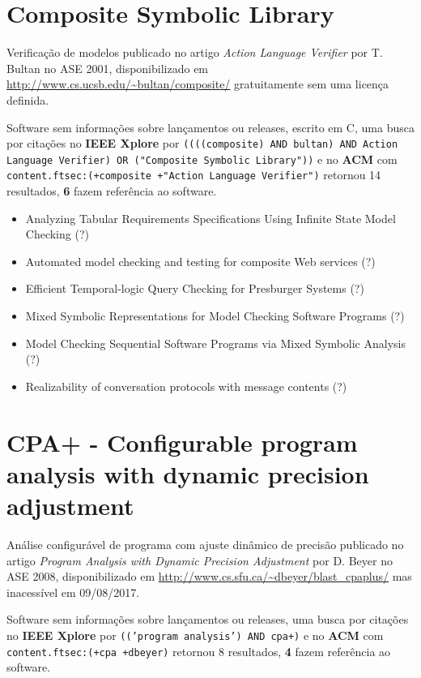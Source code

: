 \section{Composite Symbolic Library}

Verificação de modelos
publicado no artigo {\it Action Language Verifier}
por T. Bultan
no ASE 2001,
disponibilizado em \url{http://www.cs.ucsb.edu/~bultan/composite/}
gratuitamente
sem uma licença definida.

Software sem informações sobre lançamentos ou releases,
escrito em C,
uma busca por citações no {\bf IEEE Xplore} por
\texttt{((((composite) AND bultan) AND Action Language Verifier) OR ("Composite Symbolic Library"))}
e no {\bf ACM} com
\texttt{content.ftsec:(+composite +"Action Language Verifier")}
retornou
14 resultados,
{\bf 6} fazem referência ao software.

\begin{itemize}
\item Analyzing Tabular Requirements Specifications Using Infinite State Model Checking (?)
\item Automated model checking and testing for composite Web services (?)
\item Efficient Temporal-logic Query Checking for Presburger Systems (?)
\item Mixed Symbolic Representations for Model Checking Software Programs (?)
\item Model Checking Sequential Software Programs via Mixed Symbolic Analysis (?)
\item Realizability of conversation protocols with message contents (?)
\end{itemize}

\section{CPA+ - Configurable program analysis with dynamic precision adjustment}

Análise configurável de programa com ajuste dinâmico de precisão
publicado no artigo {\it Program Analysis with Dynamic Precision Adjustment}
por D. Beyer
no ASE 2008,
disponibilizado em \url{http://www.cs.sfu.ca/~dbeyer/blast_cpaplus/}
mas inacessível em 09/08/2017.

Software sem informações sobre lançamentos ou releases,
uma busca por citações no {\bf IEEE Xplore} por
\texttt{(('program analysis') AND cpa+)}
e no {\bf ACM} com
\texttt{content.ftsec:(+cpa +dbeyer)}
retornou
8 resultados,
{\bf 4} fazem referência ao software.

